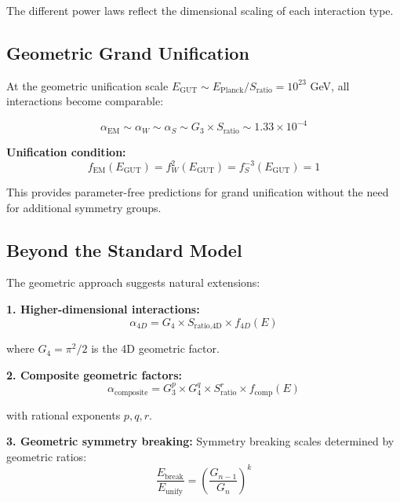 \documentclass[12pt,a4paper]{report}
\begin{document}
	The different power laws reflect the dimensional scaling of each interaction type.
	
	\subsection{Geometric Grand Unification}
	\label{subsec:geometric_grand_unification}
	
	At the geometric unification scale $E_{\text{GUT}} \sim E_{\text{Planck}}/S_{\text{ratio}} = 10^{23}$ GeV, all interactions become comparable:
	
	\begin{equation}
		\alpha_{\text{EM}} \sim \alpha_W \sim \alpha_S \sim G_3 \times S_{\text{ratio}} \sim 1.33 \times 10^{-4}
	\end{equation}
	
	\textbf{Unification condition:}
	\begin{equation}
		f_{\text{EM}}(E_{\text{GUT}}) = f_W^2(E_{\text{GUT}}) = f_S^{-3}(E_{\text{GUT}}) = 1
	\end{equation}
	
	This provides parameter-free predictions for grand unification without the need for additional symmetry groups.
	
	\subsection{Beyond the Standard Model}
	\label{subsec:beyond_standard_model}
	
	The geometric approach suggests natural extensions:
	
	\textbf{1. Higher-dimensional interactions:}
	\begin{equation}
		\alpha_{4D} = G_4 \times S_{\text{ratio,4D}} \times f_{4D}(E)
	\end{equation}
	
	where $G_4 = \pi^2/2$ is the 4D geometric factor.
	
	\textbf{2. Composite geometric factors:}
	\begin{equation}
		\alpha_{\text{composite}} = G_3^p \times G_4^q \times S_{\text{ratio}}^r \times f_{\text{comp}}(E)
	\end{equation}
	
	with rational exponents $p, q, r$.
	
	\textbf{3. Geometric symmetry breaking:}
	Symmetry breaking scales determined by geometric ratios:
	\begin{equation}
		\frac{E_{\text{break}}}{E_{\text{unify}}} = \left(\frac{G_{n-1}}{G_n}\right)^k
	\end{equation}
	
\end{document}
